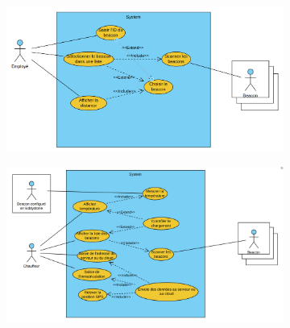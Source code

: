 \documentclass[10pt,a4paper]{book}
\begin{document}
\begin{figure}[h!]
    \centering
    \begin{subfigure}[b]{0.45\textwidth}
        \centering
        \includegraphics[scale=0.14]{Images/recherche_actif.png}
        \caption{}
        \label{recherche_actif.png2}
    \end{subfigure}
    \begin{subfigure}[b]{0.45\textwidth}
        \includegraphics[scale=0.14]{Images/controle_chargement.png}
        \caption{}
        \label{controle_chargement.png2}
    \end{subfigure}
    \caption{}
\end{figure}
\end{document}
